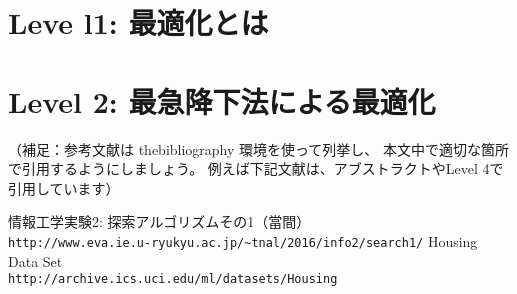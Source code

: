 \documentclass[uplatex,10pt]{jsarticle}
\begin{document}
\newpage

\section{Leve l1: 最適化とは}




\newpage

\section{Level 2: 最急降下法による最適化}




\vspace{+1.0cm}
（補足：参考文献は thebibliography 環境を使って列挙し、
本文中で適切な箇所で引用するようにしましょう。
例えば下記文献は、アブストラクトやLevel 4で引用しています）
\begin{thebibliography}{99}
情報工学実験2: 探索アルゴリズムその1（當間）\\
\verb|http://www.eva.ie.u-ryukyu.ac.jp/~tnal/2016/info2/search1/|
Housing Data Set\\
\verb|http://archive.ics.uci.edu/ml/datasets/Housing|
\end{thebibliography}
\end{document}
